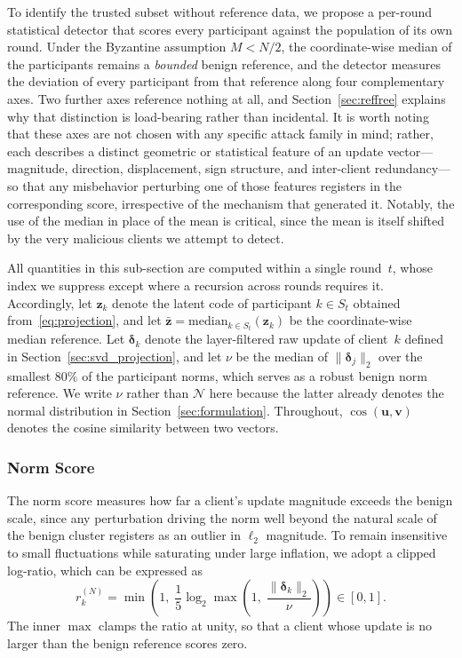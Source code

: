 \documentclass[journal]{IEEEtran}
\begin{document}
To identify the trusted subset without reference data, we propose a per-round statistical detector that scores every participant against the population of its own round. Under the Byzantine assumption $M < N/2$, the coordinate-wise median of the participants remains a \emph{bounded} benign reference, and the detector measures the deviation of every participant from that reference along four complementary axes. Two further axes reference nothing at all, and Section~\ref{sec:reffree} explains why that distinction is load-bearing rather than incidental. It is worth noting that these axes are not chosen with any specific attack family in mind; rather, each describes a distinct geometric or statistical feature of an update vector---magnitude, direction, displacement, sign structure, and inter-client redundancy---so that any misbehavior perturbing one of those features registers in the corresponding score, irrespective of the mechanism that generated it. Notably, the use of the median in place of the mean is critical, since the mean is itself shifted by the very malicious clients we attempt to detect.

All quantities in this sub-section are computed within a single round~$t$, whose index we suppress except where a recursion across rounds requires it. Accordingly, let $\mathbf{z}_k$ denote the latent code of participant $k \in S_t$ obtained from~\eqref{eq:projection}, and let $\bar{\mathbf{z}} = \mathrm{median}_{k \in S_t}(\mathbf{z}_k)$ be the coordinate-wise median reference. Let $\boldsymbol{\delta}_k$ denote the layer-filtered raw update of client~$k$ defined in Section~\ref{sec:svd_projection}, and let $\nu$ be the median of $\|\boldsymbol{\delta}_j\|_2$ over the smallest $80\%$ of the participant norms, which serves as a robust benign norm reference. We write $\nu$ rather than $\mathcal{N}$ here because the latter already denotes the normal distribution in Section~\ref{sec:formulation}. Throughout, $\cos(\mathbf{u},\mathbf{v})$ denotes the cosine similarity between two vectors.

\subsubsection{Norm Score}
The norm score measures how far a client's update magnitude exceeds the benign scale, since any perturbation driving the norm well beyond the natural scale of the benign cluster registers as an outlier in $\ell_2$ magnitude. To remain insensitive to small fluctuations while saturating under large inflation, we adopt a clipped log-ratio, which can be expressed as
\begin{equation}
r_k^{(N)} = \min\!\left(1,\; \frac{1}{5}\log_2 \max\!\left(1,\; \frac{\|\boldsymbol{\delta}_k\|_2}{\nu}\right)\right) \in [0,1].
\label{eq:norm_score}
\end{equation}
The inner $\max$ clamps the ratio at unity, so that a client whose update is no larger than the benign reference scores zero.
\end{document}
